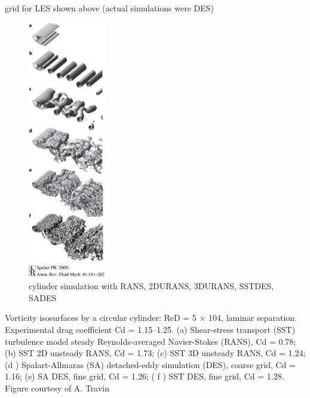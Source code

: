 \documentclass[journal]{new-aiaa}
\begin{document}
grid for LES shown above (actual simulations were DES)




\begin{figure}[H]
\begin{center}
\includegraphics[width=0.3\textwidth]{Images/logan/spalart2009detachededdy_CylinderVariousTurbModels.jpeg}
\caption{ cylinder simulation with RANS, 2DURANS, 3DURANS, SSTDES, SADES \cite{spalart2009detachededdy} }
\label{fig:cylinderturbmodels}
\end{center}
\end{figure}

Vorticity isosurfaces by a circular cylinder: ReD = 5 × 104, laminar separation. Experimental drag
coefficient Cd = 1.15–1.25. (a) Shear-stress transport (SST) turbulence model steady Reynolds-averaged
Navier-Stokes (RANS), Cd = 0.78; (b) SST 2D unsteady RANS, Cd = 1.73; (c) SST 3D unsteady RANS,
Cd = 1.24; (d ) Spalart-Allmaras (SA) detached-eddy simulation (DES), coarse grid, Cd = 1.16; (e) SA DES,
fine grid, Cd = 1.26; ( f ) SST DES, fine grid, Cd = 1.28. Figure courtesy of A. Travin
\end{document}
